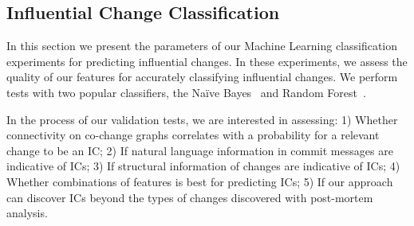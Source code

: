 \subsection{Influential Change Classification}
In this section we present the parameters of our Machine Learning classification
experiments for predicting influential changes. In these experiments, we assess
the quality of our features for accurately classifying influential
changes. We perform tests with two
popular classifiers, the Na\"{i}ve Bayes~\cite{lewis:ecml:1998,mlbook}
and Random Forest~\cite{breiman_random_2001}.



In the process of our validation tests, we are interested in assessing: 1)
Whether connectivity on co-change graphs correlates with a probability
for a relevant change to be an IC; 2) If natural language information in
commit messages are indicative of ICs; 3) If structural information of changes
are indicative of ICs; 4) Whether combinations of features is best for
predicting ICs; 5) If our approach can discover ICs beyond the types of
changes discovered with post-mortem analysis.



